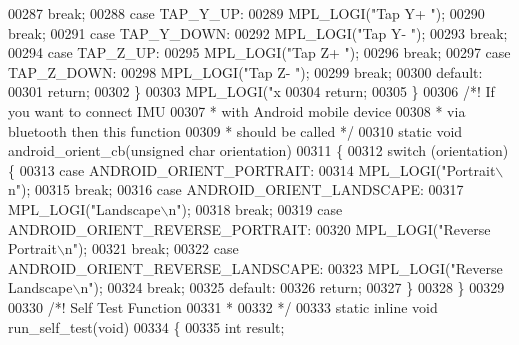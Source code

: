 \begin{DoxyCode}
{{{{{00287         \textcolor{keywordflow}{break};
00288     \textcolor{keywordflow}{case} TAP\_Y\_UP:
00289         MPL\_LOGI(\textcolor{stringliteral}{"Tap Y+ "});
00290         \textcolor{keywordflow}{break};
00291     \textcolor{keywordflow}{case} TAP\_Y\_DOWN:
00292         MPL\_LOGI(\textcolor{stringliteral}{"Tap Y- "});
00293         \textcolor{keywordflow}{break};
00294     \textcolor{keywordflow}{case} TAP\_Z\_UP:
00295         MPL\_LOGI(\textcolor{stringliteral}{"Tap Z+ "});
00296         \textcolor{keywordflow}{break};
00297     \textcolor{keywordflow}{case} TAP\_Z\_DOWN:
00298         MPL\_LOGI(\textcolor{stringliteral}{"Tap Z- "});
00299         \textcolor{keywordflow}{break};
00300     \textcolor{keywordflow}{default}:
00301         \textcolor{keywordflow}{return};
00302     \}
00303     MPL\_LOGI(\textcolor{stringliteral}{"x%
00304     \textcolor{keywordflow}{return};
00305 \}
00306 \textcolor{comment}{/*! If you want to connect IMU}
00307 \textcolor{comment}{ *  with Android mobile device}
00308 \textcolor{comment}{ *  via bluetooth then this function}
00309 \textcolor{comment}{ *  should be called */}
00310 \textcolor{keyword}{static} \textcolor{keywordtype}{void} android_orient_cb(\textcolor{keywordtype}{unsigned} \textcolor{keywordtype}{char} orientation)
00311 \{
00312     \textcolor{keywordflow}{switch} (orientation) \{
00313     \textcolor{keywordflow}{case} ANDROID\_ORIENT\_PORTRAIT:
00314         MPL\_LOGI(\textcolor{stringliteral}{"Portrait\(\backslash\)n"});
00315         \textcolor{keywordflow}{break};
00316     \textcolor{keywordflow}{case} ANDROID\_ORIENT\_LANDSCAPE:
00317         MPL\_LOGI(\textcolor{stringliteral}{"Landscape\(\backslash\)n"});
00318         \textcolor{keywordflow}{break};
00319     \textcolor{keywordflow}{case} ANDROID\_ORIENT\_REVERSE\_PORTRAIT:
00320         MPL\_LOGI(\textcolor{stringliteral}{"Reverse Portrait\(\backslash\)n"});
00321         \textcolor{keywordflow}{break};
00322     \textcolor{keywordflow}{case} ANDROID\_ORIENT\_REVERSE\_LANDSCAPE:
00323         MPL\_LOGI(\textcolor{stringliteral}{"Reverse Landscape\(\backslash\)n"});
00324         \textcolor{keywordflow}{break};
00325     \textcolor{keywordflow}{default}:
00326         \textcolor{keywordflow}{return};
00327     \}
00328 \}
00329 
00330 \textcolor{comment}{/*! Self Test Function}
00331 \textcolor{comment}{ *}
00332 \textcolor{comment}{ */}
00333 \textcolor{keyword}{static} \textcolor{keyword}{inline} \textcolor{keywordtype}{void} run_self_test(\textcolor{keywordtype}{void})
00334 \{
00335     \textcolor{keywordtype}{int} result;
}}}}}}
\end{DoxyCode}
